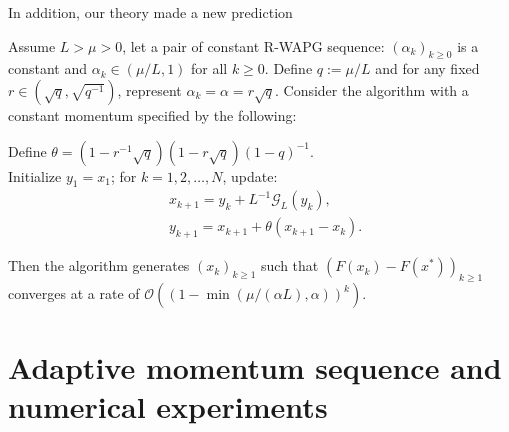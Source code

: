 \documentclass[11pt]{beamer}
\theoremstyle{definition}
\begin{document}
        \begin{frame}{In addition, our theory made a new prediction}
            \begin{theorem}\label{thm:fixed-momentum-fista}
                {\small
                Assume $L > \mu > 0$, let a pair of constant R-WAPG sequence: $(\alpha_k)_{k \ge0}$ is a constant and $\alpha_k \in (\mu/L, 1)$ for all $k \ge 0$.
                Define $q := \mu/L$ and for any fixed $r \in \left(\sqrt{q}, \sqrt{q^{-1}}\right)$, represent $\alpha_k = \alpha = r \sqrt{q}$. 
                Consider the algorithm with a constant momentum specified by the following:
                \begin{tcolorbox}
                    Define $\theta = \left(1 - r^{-1}\sqrt{q}\right)(1 - r\sqrt{q})(1 - q)^{-1}$.
                    \\
                    Initialize $y_1 = x_1$; for $k = 1, 2, \ldots, N$, update:
                    \begin{align*}
                        &x_{k + 1} = y_k + L^{-1}\mathcal G_L (y_k)
                        ,
                        \\
                        & y_{k + 1} = x_{k + 1} + \theta(x_{k + 1} - x_k).
                    \end{align*}
                \end{tcolorbox}
                Then the algorithm generates $(x_k)_{k \ge 1}$ such that $(F(x_{k}) - F(x^*))_{k\geq 1}$ converges at a rate of $\mathcal O\left(\left(1 - \min\left(\mu/(\alpha L), \alpha\right)\right)^k\right)$.
                }
            \end{theorem}
        \end{frame}

\section{Adaptive momentum sequence and numerical experiments}
\end{document}
